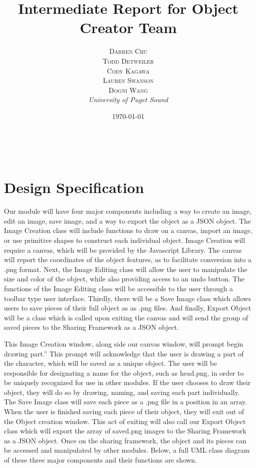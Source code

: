 \documentclass[a4paper, 11pt]{article} %
\title{\textbf{Intermediate Report for Object Creator Team}}
\author{\textsc{Darren Chu\\Todd Detweiler\\Cody Kagawa\\Lauren Swanson\\Dogni Wang} %
\\{\textit{University of Puget Sound}}} %
\date{\today} %
\makeatletter
\renewcommand{\maketitle}{ %
\begin{flushright} %
{\LARGE\@title} %

\vspace{50pt} %

{\large\@author} %
\\\@date %

\vspace{40pt} %
\end{flushright}
}
\makeatother
\begin{document}
\maketitle %


\section*{Design Specification}

Our module will have four major components including a way to create an image, edit an image, save image, and a way to export the object as a JSON object. The Image Creation class will include functions to draw on a canvas, import an image, or use primitive shapes to construct each individual object. Image Creation will require a canvas, which will be provided by the Javascript Library. The canvas will report the coordinates of the object features, as to facilitate conversion into a .png format. Next, the Image Editing class will allow the user to manipulate the size and color of the object, while also providing access to an undo button. The functions of the Image Editing class will be accessible to the user through a toolbar type user interface. Thirdly, there will be a Save Image class which allows users to save pieces of their full object as as .png files. And finally, Export Object will be a class which is called upon exiting the canvas and will send the group of saved pieces to the Sharing Framework as a JSON object.

This Image Creation window, along side our canvas window, will prompt begin drawing part.” This prompt will acknowledge that the user is drawing a part of the character, which will be saved as a unique object. The user will be responsible for designating a name for the object, such as head.png, in order to be uniquely recognized for use in other modules. If the user chooses to draw their object, they will do so by drawing, naming, and saving each part individually. The Save Image class will save each piece as a .png file in a position in an array. When the user is finished saving each piece of their object, they will exit out of the Object creation window. This act of exiting will also call our Export Object class which will export the array of saved.png images to the Sharing Framework as a JSON object. Once on the sharing framework, the object and its pieces can be accessed and manipulated by other modules. Below, a full UML class diagram of these three major components and their functions are shown.
\end{document}
